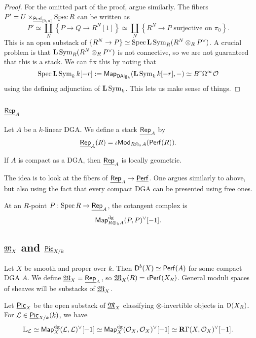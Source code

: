 \documentclass{amsart}
\begin{document}
\begin{proof}
	For the omitted part of the proof, argue similarly.
	The fibers $P' = U \times_{\underline{\mathsf{Perf}}_{[0,n]}} \operatorname{Spec} R$ can be written as
	\[
		P' \simeq \coprod_N \left\{ P \to Q \to R^N[1] \right\} \simeq \coprod_N \left\{ R^N \to P \textrm{ surjective on } \pi_0 \right\}.
	\]
	This is an open substack of $\{ R^N \to P \} \simeq \operatorname{Spec} \mathbf{L} \operatorname{Sym}_R (R^N \otimes_R P^\vee)$.
	A crucial problem is that $\mathbf{L} \operatorname{Sym}_R (R^N \otimes_R P^\vee)$ is not connective, so we are not guaranteed that this is a stack.
	We can fix this by noting that
	\[
		\operatorname{Spec} \mathbf{L} \operatorname{Sym}_k k[-r] := \mathsf{Map}_{\mathsf{DAlg}_k}(\mathbf{L} \operatorname{Sym}_k k[-r], -) \simeq B^r \Omega^\infty \mathcal{O}
	\]
	using the defining adjunction of $\mathbf{L} \operatorname{Sym}_k$.
	This lets us make sense of things.
\end{proof}

\subsection{$\underline{\mathsf{Rep}}_A$}

Let $A$ be a $k$-linear DGA.
We define a stack $\underline{\mathsf{Rep}}_A$ by
\[
	\underline{\mathsf{Rep}}_A(R) = \iota \mathsf{Mod}_{R \otimes_k A}(\mathsf{Perf}(R)).
\]

\begin{thm}[To\"en-Vaqui\'e]
	If $A$ is compact as a DGA, then $\underline{\mathsf{Rep}}_A$ is locally geometric.
\end{thm}

The idea is to look at the fibers of $\underline{\mathsf{Rep}}_A \to \underline{\mathsf{Perf}}$.
One argues similarly to above, but also using the fact that every compact DGA can be presented using free ones.

\begin{lem}
	At an $R$-point $P: \operatorname{Spec} R \to \underline{\mathsf{Rep}}_A$, the cotangent complex is
	\[
		\mathsf{Map}_{R \otimes_k A}^{\textrm{dg}}(P, P)^\vee[-1].
	\]
\end{lem}

\subsection{$\underline{\mathfrak{M}}_X$ and $\underline{\mathsf{Pic}}_{X/k}$}

Let $X$ be smooth and proper over $k$.
Then $\mathsf{D}^b(X) \simeq \mathsf{Perf}(A)$ for some compact DGA $A$.
We define $\underline{\mathfrak{M}}_X = \underline{\mathsf{Rep}}_A$, so $\underline{\mathfrak{M}}_X(R) = \iota \mathsf{Perf}(X_R)$.
General moduli spaces of sheaves will be substacks of $\underline{\mathfrak{M}}_X$.

Let $\underline{\mathsf{Pic}}_X$ be the open substack of $\underline{\mathfrak{M}}_X$ classifying $\otimes$-invertible objects in $\mathsf{D}(X_R)$.
For $\mathcal{L} \in \underline{\mathsf{Pic}}_{X/k}(k)$, we have
\[
	\mathbb{L}_{\mathcal{L}} \simeq \mathsf{Map}_X^{\textrm{dg}}(\mathcal{L}, \mathcal{L})^\vee[-1] \simeq \mathsf{Map}_X^{\textrm{dg}}(\mathcal{O}_X, \mathcal{O}_X)^\vee[-1] \simeq \mathbf{R} \Gamma(X, \mathcal{O}_X)^\vee[-1].
\]
\end{document}
